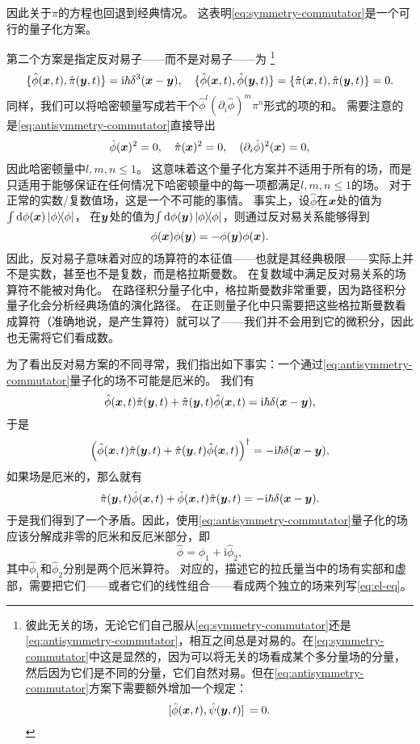 \documentclass[hyperref, UTF8, a4paper]{ctexart}
\newcommand*{\ii}{\mathrm{i}}
\begin{document}
因此关于$\pi$的方程也回退到经典情况。
这表明\eqref{eq:symmetry-commutator}是一个可行的量子化方案。

第二个方案是指定反对易子——而不是对易子——为%
\footnote{彼此无关的场，无论它们自己服从\eqref{eq:symmetry-commutator}还是\eqref{eq:antisymmetry-commutator}，相互之间总是对易的。在\eqref{eq:symmetry-commutator}中这是显然的，因为可以将无关的场看成某个多分量场的分量，然后因为它们是不同的分量，它们自然对易。但在\eqref{eq:antisymmetry-commutator}方案下需要额外增加一个规定：
\[
    \comm*{\hat{\phi}(\vb*{x}, t)}{\hat{\psi}(\vb*{y}, t)} = 0.
\]
}
\begin{equation}
    \{\hat{\phi}(\vb*{x}, t), \hat{\pi}(\vb*{y}, t)\} = \ii \hbar \delta^3(\vb*{x} - \vb*{y}), \quad \{\hat{\phi}(\vb*{x}, t), \hat{\phi}(\vb*{y}, t)\} = \{\hat{\pi}(\vb*{x}, t), \hat{\pi}(\vb*{y}, t)\} = 0.
    \label{eq:antisymmetry-commutator}
\end{equation}
同样，我们可以将哈密顿量写成若干个$\hat{\phi}^l (\partial_i \hat{\phi})^m \pi^n$形式的项的和。
需要注意的是\eqref{eq:antisymmetry-commutator}直接导出
\[
    \hat{\phi}(\vb*{x})^2 = 0, \quad \hat{\pi}(\vb*{x})^2 = 0, \quad (\partial_i \hat{\phi})^2(\vb*{x}) = 0,
\]
因此哈密顿量中$l, m, n \leq 1$。
这意味着这个量子化方案并不适用于所有的场，而是只适用于能够保证在任何情况下哈密顿量中的每一项都满足$l, m, n \leq 1$的场。
对于正常的实数/复数值场，这是一个不可能的事情。
事实上，设$\hat{\phi}$在$\vb*{x}$处的值为$\int \dd \phi(\vb*{x}) \dyad{\phi}$，
在$\vb*{y}$处的值为$\int \dd \phi(\vb*{y}) \dyad{\phi}$，则通过反对易关系能够得到
\[
    \phi(\vb*{x}) \phi(\vb*{y}) = - \phi(\vb*{y}) \phi(\vb*{x}).
\]
因此，反对易子意味着对应的场算符的本征值——也就是其经典极限——实际上并不是实数，甚至也不是复数，而是格拉斯曼数。
在复数域中满足反对易关系的场算符不能被对角化。
在路径积分量子化中，格拉斯曼数非常重要，因为路径积分量子化会分析经典场值的演化路径。
在正则量子化中只需要把这些格拉斯曼数看成算符（准确地说，是产生算符）就可以了——我们并不会用到它的微积分，因此也无需将它们看成数。

为了看出反对易方案的不同寻常，我们指出如下事实：一个通过\eqref{eq:antisymmetry-commutator}量子化的场不可能是厄米的。
我们有
\[
    \hat{\phi}(\vb*{x}, t) \hat{\pi} (\vb*{y}, t) + \hat{\pi} (\vb*{y}, t) \hat{\phi} (\vb*{x}, t) = \ii \hbar \delta(\vb*{x} - \vb*{y}),
\]
于是
\[
    \left(\hat{\phi}(\vb*{x}, t) \hat{\pi} (\vb*{y}, t) + \hat{\pi} (\vb*{y}, t) \hat{\phi} (\vb*{x}, t)\right)^\dagger = - \ii \hbar \delta(\vb*{x} - \vb*{y}),
\]
如果场是厄米的，那么就有
\[
    \hat{\pi} (\vb*{y}, t) \hat{\phi} (\vb*{x}, t) + \hat{\phi}(\vb*{x}, t) \hat{\pi} (\vb*{y}, t) = - \ii \hbar \delta(\vb*{x} - \vb*{y}).
\]
于是我们得到了一个矛盾。因此，使用\eqref{eq:antisymmetry-commutator}量子化的场应该分解成非零的厄米和反厄米部分，即
\begin{equation}
    \hat{\phi} = \hat{\phi}_1 + \ii \hat{\phi}_2,
\end{equation}
其中$\hat{\phi}_1$和$\hat{\phi}_2$分别是两个厄米算符。
对应的，描述它的拉氏量当中的场有实部和虚部，需要把它们——或者它们的线性组合——看成两个独立的场来列写\eqref{eq:el-eq}。
\end{document}
